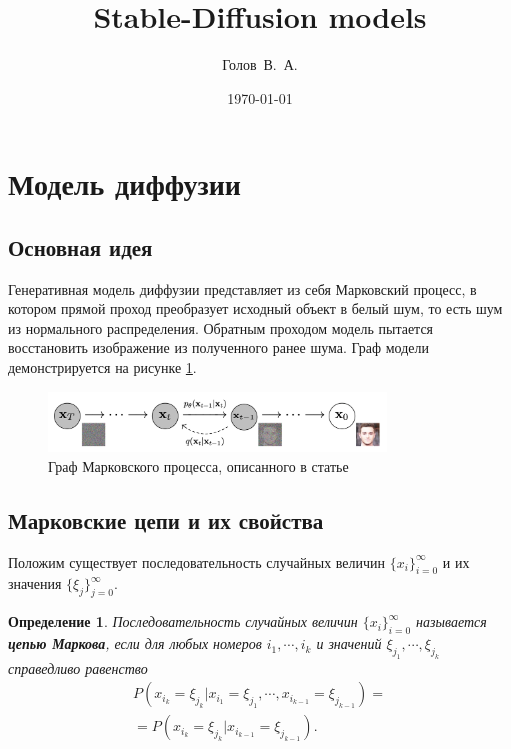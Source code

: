 \documentclass[11pt, a4paper, twocolumn, twoside]{article} %
\title{Stable-Diffusion models}
\author{Голов~В.~А.}
\affil{Конспекты по пройденному материалу}
\date{\today}
\newtheorem{definition}{Определение}[section]
\begin{document}
\maketitle
\setcounter{tocdepth}{2}
\tableofcontents

\section{Модель диффузии}

\subsection{Основная идея}

Генеративная модель диффузии представляет из себя Марковский процесс, в котором прямой проход преобразует исходный объект в белый шум, то есть шум из нормального распределения. Обратным проходом модель пытается восстановить изображение из полученного ранее шума. Граф модели демонстрируется на рисунке \ref{img: 1}. 

\begin{figure}[hbt]
  \centering
  \includegraphics[width=0.8\textwidth]{imgs/1.png}
  \caption{Граф Марковского процесса, описанного в статье}
  \label{img: 1}
\end{figure}

\subsection{Марковские цепи и их свойства}

Положим существует последовательность случайных величин $\{x_i\}_{i=0}^\infty$ и их значения $\{\xi_j\}_{j=0}^\infty$.

\begin{definition}
	Последовательность случайных величин $\{x_i\}_{i=0}^\infty$ называется \textbf{цепью Маркова}, если для любых номеров $i_1,\cdots, i_k$ и значений $\xi_{j_1},\cdots,\xi_{j_k}$ справедливо равенство 
	\begin{multline}
		P(x_{i_k} = \xi_{j_k}| x_{i_1} = \xi_{j_1},\cdots, x_{i_{k-1}} = \xi_{j_{k-1}}) = \\ = P(x_{i_k} = \xi_{j_k}| x_{i_{k-1}} = \xi_{j_{k-1}}).
	\end{multline}
\end{definition}
\end{document}
